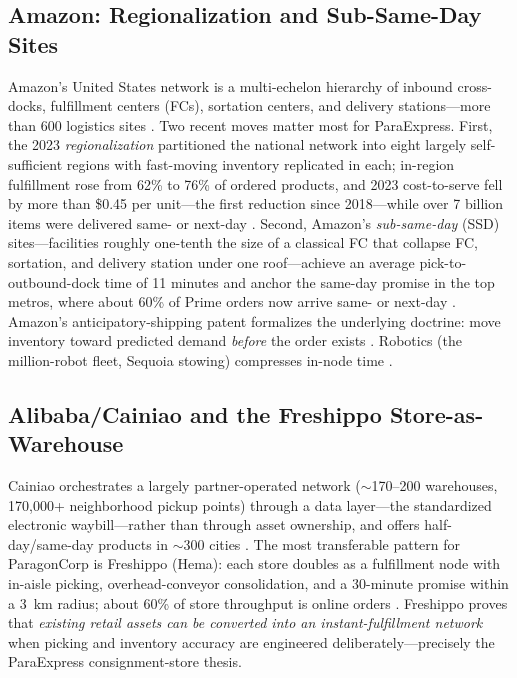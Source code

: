 \documentclass[journal]{IEEEtran}
\begin{document}
\subsection{Amazon: Regionalization and Sub-Same-Day Sites}
Amazon's United States network is a multi-echelon hierarchy of inbound cross-docks, fulfillment centers (FCs), sortation centers, and delivery stations---more than 600 logistics sites \cite{redstag}. Two recent moves matter most for ParaExpress. First, the 2023 \emph{regionalization} partitioned the national network into eight largely self-sufficient regions with fast-moving inventory replicated in each; in-region fulfillment rose from 62\% to 76\% of ordered products, and 2023 cost-to-serve fell by more than \$0.45 per unit---the first reduction since 2018---while over 7 billion items were delivered same- or next-day \cite{amazonregional,scdive,amazonscience}. Second, Amazon's \emph{sub-same-day} (SSD) sites---facilities roughly one-tenth the size of a classical FC that collapse FC, sortation, and delivery station under one roof---achieve an average pick-to-outbound-dock time of 11 minutes and anchor the same-day promise in the top metros, where about 60\% of Prime orders now arrive same- or next-day \cite{costar,cnbcprime}. Amazon's anticipatory-shipping patent formalizes the underlying doctrine: move inventory toward predicted demand \emph{before} the order exists \cite{anticipatory}. Robotics (the million-robot fleet, Sequoia stowing) compresses in-node time \cite{sequoia,millionrobot}.

\subsection{Alibaba/Cainiao and the Freshippo Store-as-Warehouse}
Cainiao orchestrates a largely partner-operated network (${\sim}$170--200 warehouses, 170{,}000+ neighborhood pickup points) through a data layer---the standardized electronic waybill---rather than through asset ownership, and offers half-day/same-day products in ${\sim}$300 cities \cite{cainiao,cainiaoexpress}. The most transferable pattern for ParagonCorp is Freshippo (Hema): each store doubles as a fulfillment node with in-aisle picking, overhead-conveyor consolidation, and a 30-minute promise within a 3~km radius; about 60\% of store throughput is online orders \cite{hema}. Freshippo proves that \emph{existing retail assets can be converted into an instant-fulfillment network} when picking and inventory accuracy are engineered deliberately---precisely the ParaExpress consignment-store thesis.
\end{document}
